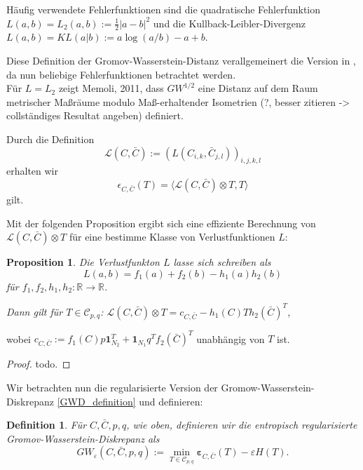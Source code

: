 \documentclass[twoside, 12pt,a4paper]{article}
\newtheorem{proposition}[theorem]{Proposition}
\newtheorem{definition}[theorem]{Definition}
\numberwithin{equation}{section}
\begin{document}
	\noindent Häufig verwendete Fehlerfunktionen sind die quadratische Fehlerfunktion $L(a,b) = L_2(a,b) := \frac{1}{2}|a-b|^2$ und die Kullback-Leibler-Divergenz $L(a,b)  = KL(a|b) := a\log(a/b) -a+b$.
	
	Diese Definition der Gromov-Wasserstein-Distanz verallgemeinert die Version in \cite{gwd_averaging_kernels}, da nun beliebige Fehlerfunktionen betrachtet werden.\\
	
	Für $L=L_2 $ zeigt Memoli, 2011, dass $GW^{1/2}$ eine Distanz auf dem Raum metrischer Maßräume modulo Maß-erhaltender Isometrien (?, besser zitieren -> collständiges Resultat angeben) definiert.
	
	Durch die Definition 
	\begin{equation}
		\mathcal{L} (C, \bar{C}):= (L(C_{i,k}, \bar{C}_{j,l}))_{i,j,k,l}
	\end{equation}
	erhalten wir
	\begin{equation}
		\mathcal{\epsilon}_{C, \bar{C}}(T) = \langle \mathcal{L} (C, \bar{C}) \otimes T, T\rangle
	\end{equation}
	gilt.
	
	Mit der folgenden Proposition ergibt sich eine effiziente Berechnung von $\mathcal{L} (C, \bar{C}) \otimes T$ für eine bestimme Klasse von Verlustfunktionen $L$:
	
	\begin{proposition}
		Die Verlustfunkton $L$ lasse sich schreiben als 
		\begin{equation}
			L(a,b) = f_1(a) + f_2(b) - h_1(a)h_2(b)
		\end{equation}
		für $f_1, f_2,h_1, h_2:\mathbb{R} \to \mathbb{R}$.
		
		Dann gilt für $T \in \mathcal{C}_{p,q}$:
		$\mathcal{L} (C, \bar{C}) \otimes T = c_{C, \bar{C}} - h_1(C)Th_2(\bar{C})^T$,
	\end{proposition} 
	wobei $c_{C, \bar{C}}:= f_1(C)p \boldsymbol{1}_{N_2}^T + \boldsymbol{1}_{N_1}q^Tf_2(\bar{C})^T$ unabhängig von $T$ ist.
	
	\begin{proof}
		todo.
	\end{proof}

	Wir betrachten nun die regularisierte Version der Gromow-Wasserstein-Diskrepanz \ref{GWD_definition} und definieren:
	
	\begin{definition}
		Für $C, \bar{C}, p, q$, wie oben, definieren wir die entropisch regularisierte Gromov-Wasserstein-Diskrepanz als 
		\begin{equation}
			GW_{\varepsilon}(C,\bar{C}, p, q):=\min_{T \in \mathcal{C}_{p, q}} \boldsymbol{\varepsilon}_{C, \bar{C}}(T) -\varepsilon H(T).
		\end{equation}
	\end{definition}
	
\end{document}
